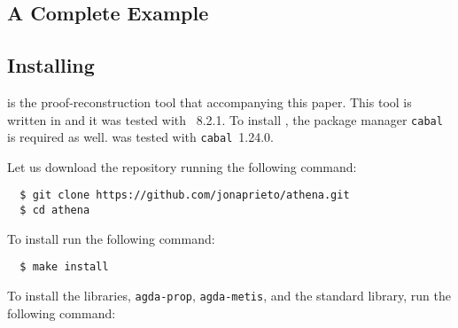 \documentclass[../main.tex]{subfiles}
\begin{document}
\begin{subappendices}


\clearpage
\section{A Complete Example}
\label{app:complete-example}

\subsection{Installing \Athena}

\Athena is the proof-reconstruction tool that accompanying this paper.
This tool is written in \Haskell and it was tested with ~8.2.1.
To install \Athena, the package manager \verb!cabal! is required as well.
\Athena was tested with \verb!cabal!~1.24.0.

Let us download the \Athena repository running the following command:

\begin{verbatim}
  $ git clone https://github.com/jonaprieto/athena.git
  $ cd athena
\end{verbatim}

To install \Athena run the following command:

\begin{verbatim}
  $ make install
\end{verbatim}

To install the \Agda libraries, \verb!agda-prop!, \verb!agda-metis!, and
the \Agda standard library, run the following command:


\end{subappendices}
\end{document}
